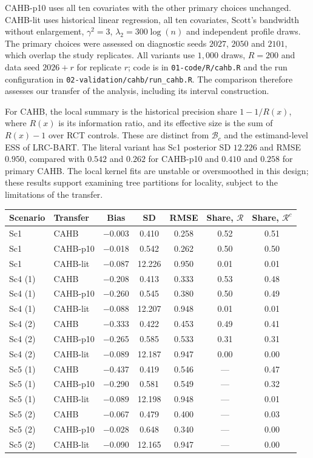 \documentclass[11pt]{article}
\theoremstyle{definition}
\theoremstyle{plain}
\begin{document}
CAHB-p10 uses all ten covariates with the other primary choices unchanged. CAHB-lit uses historical linear regression, all ten covariates, Scott's bandwidth without enlargement, $\gamma^2=3$, $\lambda_2=300\log(n)$ and independent profile draws. The primary choices were assessed on diagnostic seeds $2027$, $2050$ and $2101$, which overlap the study replicates. All variants use $1{,}000$ draws, $R=200$ and data seed $2026+r$ for replicate $r$; code is in \texttt{01-code/R/cahb.R} and the run configuration in \texttt{02-validation/cahb/run\_cahb.R}. The comparison therefore assesses our transfer of the analysis, including its interval construction.

For CAHB, the local summary is the historical precision share $1-1/R(x)$, where $R(x)$ is its information ratio, and its effective size is the sum of $R(x)-1$ over RCT controls. These are distinct from $\mathcal B_c$ and the estimand-level ESS of LRC-BART. The literal variant has Sc1 posterior SD $12.226$ and RMSE $0.950$, compared with $0.542$ and $0.262$ for CAHB-p10 and $0.410$ and $0.258$ for primary CAHB. The local kernel fits are unstable or oversmoothed in this design; these results support examining tree partitions for locality, subject to the limitations of the transfer.

\begin{center}\scriptsize
\begin{tabular}{llccccc}
\toprule
Scenario & Transfer & Bias & SD & RMSE & Share, $\mathcal R$ & Share, $\mathcal R^c$ \\
\midrule
Sc1 & CAHB & $-$0.003 & 0.410 & 0.258 & 0.52 & 0.51 \\
Sc1 & CAHB-p10 & $-$0.018 & 0.542 & 0.262 & 0.50 & 0.50 \\
Sc1 & CAHB-lit & $-$0.087 & 12.226 & 0.950 & 0.01 & 0.01 \\
Sc4 (1) & CAHB & $-$0.208 & 0.413 & 0.333 & 0.53 & 0.48 \\
Sc4 (1) & CAHB-p10 & $-$0.260 & 0.545 & 0.380 & 0.50 & 0.49 \\
Sc4 (1) & CAHB-lit & $-$0.088 & 12.207 & 0.948 & 0.01 & 0.01 \\
Sc4 (2) & CAHB & $-$0.333 & 0.422 & 0.453 & 0.49 & 0.41 \\
Sc4 (2) & CAHB-p10 & $-$0.265 & 0.585 & 0.533 & 0.31 & 0.31 \\
Sc4 (2) & CAHB-lit & $-$0.089 & 12.187 & 0.947 & 0.00 & 0.00 \\
Sc5 (1) & CAHB & $-$0.437 & 0.419 & 0.546 & --- & 0.47 \\
Sc5 (1) & CAHB-p10 & $-$0.290 & 0.581 & 0.549 & --- & 0.32 \\
Sc5 (1) & CAHB-lit & $-$0.089 & 12.198 & 0.948 & --- & 0.01 \\
Sc5 (2) & CAHB & $-$0.067 & 0.479 & 0.400 & --- & 0.03 \\
Sc5 (2) & CAHB-p10 & $-$0.028 & 0.648 & 0.340 & --- & 0.00 \\
Sc5 (2) & CAHB-lit & $-$0.090 & 12.165 & 0.947 & --- & 0.00 \\
\bottomrule
\end{tabular}
\end{center}
\end{document}
